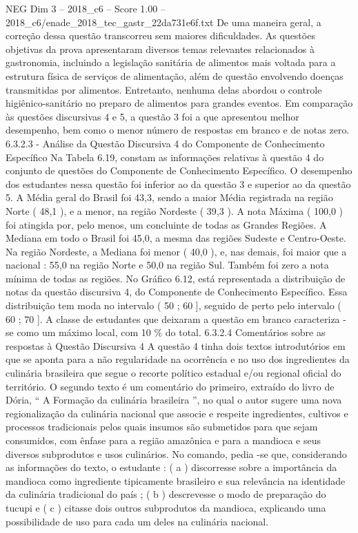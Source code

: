 \begin{textsample}{NEG Dim 3 – 2018\_c6 – Score 1.00 – 2018\_c6/enade\_2018\_tec\_gastr\_22da731e6f.txt}
De uma maneira geral, a correção dessa questão transcorreu sem maiores dificuldades.
As questões objetivas da prova apresentaram diversos temas relevantes relacionados à gastronomia, incluindo a legislação sanitária de alimentos mais voltada para a estrutura física de serviços de alimentação, além de questão envolvendo doenças transmitidas por alimentos.
Entretanto, nenhuma delas abordou o controle higiênico-sanitário no preparo de alimentos para grandes eventos.
Em comparação às questões discursivas 4 e 5, a questão 3 foi a que apresentou melhor desempenho, bem como o menor número de respostas em branco e de notas zero. 6.3.2.3 - Análise da Questão Discursiva 4 do Componente de Conhecimento Específico Na Tabela 6.19, constam as informações relativas à questão 4 do conjunto de questões do Componente de Conhecimento Específico.
O desempenho dos estudantes nessa questão foi inferior ao da questão 3 e superior ao da questão 5.
A Média geral do Brasil foi 43,3, sendo a maior Média registrada na região Norte ( 48,1 ), e a menor, na região Nordeste ( 39,3 ).
A nota Máxima ( 100,0 ) foi atingida por, pelo menos, um concluinte de todas as Grandes Regiões.
A Mediana em todo o Brasil foi 45,0, a mesma das regiões Sudeste e Centro-Oeste.
Na região Nordeste, a Mediana foi menor ( 40,0 ), e, nas demais, foi maior que a nacional : 55,0 na região Norte e 50,0 na região Sul.
Também foi zero a nota mínima de todas as regiões.
No Gráfico 6.12, está representada a distribuição de notas da questão discursiva 4, do Componente de Conhecimento Específico.
Essa distribuição tem moda no intervalo ( 50 ; 60 ], seguido de perto pelo intervalo ( 60 ; 70 ].
A classe de estudantes que deixaram a questão em branco caracteriza -se como um máximo local, com 10 \% do total. 6.3.2.4 Comentários sobre as respostas à Questão Discursiva 4 A questão 4 tinha dois textos introdutórios em que se aponta para a não regularidade na ocorrência e no uso dos ingredientes da culinária brasileira que segue o recorte político estadual e/ou regional oficial do território.
O segundo texto é um comentário do primeiro, extraído do livro de Dória, “ A Formação da culinária brasileira ”, no qual o autor sugere uma nova regionalização da culinária nacional que associe e respeite ingredientes, cultivos e processos tradicionais pelos quais insumos são submetidos para que sejam consumidos, com ênfase para a região amazônica e para a mandioca e seus diversos subprodutos e usos culinários.
No comando, pedia -se que, considerando as informações do texto, o estudante : ( a ) discorresse sobre a importância da mandioca como ingrediente tipicamente brasileiro e sua relevância na identidade da culinária tradicional do país ; ( b ) descrevesse o modo de preparação do tucupi e ( c ) citasse dois outros subprodutos da mandioca, explicando uma possibilidade de uso para cada um deles na culinária nacional.

\end{textsample}

